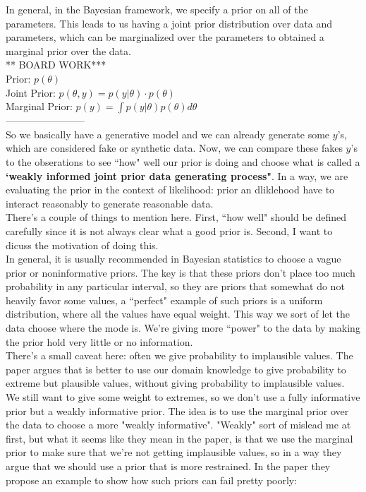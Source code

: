 \documentclass[]{article}
\begin{document}
\noindent In general, in the Bayesian framework, we specify a prior on all of the parameters. This leads to us having a joint prior distribution over data and parameters, which can be marginalized over the parameters to obtained a marginal prior over the data. \\

\noindent*** BOARD WORK*** \\
Prior: $ p(\theta)$ \\
Joint Prior: $p(\theta, y) = p(y | \theta) \cdot p(\theta)$ \\
Marginal Prior: $p(y) = \int p(y|\theta) p(\theta) d\theta$\\
------------------------\\
So we basically have a generative model and we can already generate some $y$'s, which are considered fake or synthetic data. Now, we can compare these fakes $y$'s to the obserations to see ``how" well our prior is doing and choose what is called a \textbf{`weakly informed joint prior data generating process"}. In a way, we are evaluating the prior in the context of likelihood: prior an dliklehood have to interact reasonably to generate reasonable data. \\There's a couple of things to mention here. First, ``how well" should be defined carefully since it is not always clear what a good prior is. Second, I want to dicuss the motivation of doing this. \\ 

\noindent In general, it is usually recommended in Bayesian statistics to choose a vague prior or noninformative priors. The key is that these priors don't place too much probability in any particular interval, so they are priors that somewhat do not heavily favor some values, a ``perfect" example of such priors is a uniform distribution, where all the values have equal weight. This way we sort of let the data choose where the mode is. We're giving more ``power" to the data by making the prior hold very little or no information. \\

\noindent There's a small caveat here: often we give probability to implausible values. The paper argues that is better to use our domain knowledge to give probability to extreme but plausible values, without giving probability to implausible values. We still want to give some weight to extremes, so we don't use a fully informative prior but a weakly informative prior. The idea is to use the marginal prior over the data to choose a more "weakly informative". "Weakly" sort of mislead me at first, but what it seems like they mean in the paper, is that we use the marginal prior to make sure that we're not getting implausible values, so in a way they argue that we should use a prior that is more restrained. In the paper they propose an example to show how such priors can fail pretty poorly: \\
\end{document}
